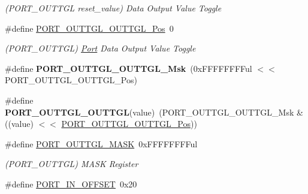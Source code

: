 \begin{DoxyCompactItemize}
\begin{DoxyCompactList}\small\item\em (P\+O\+R\+T\+\_\+\+O\+U\+T\+T\+G\+L reset\+\_\+value) Data Output Value Toggle \end{DoxyCompactList}\item 
\hypertarget{group___s_a_m_l21___p_o_r_t_ga9cccd9f68244563b806d73204ee44c3e}{}\#define \hyperlink{group___s_a_m_l21___p_o_r_t_ga9cccd9f68244563b806d73204ee44c3e}{P\+O\+R\+T\+\_\+\+O\+U\+T\+T\+G\+L\+\_\+\+O\+U\+T\+T\+G\+L\+\_\+\+Pos}~0\label{group___s_a_m_l21___p_o_r_t_ga9cccd9f68244563b806d73204ee44c3e}

\begin{DoxyCompactList}\small\item\em (P\+O\+R\+T\+\_\+\+O\+U\+T\+T\+G\+L) \hyperlink{struct_port}{Port} Data Output Value Toggle \end{DoxyCompactList}\item 
\hypertarget{group___s_a_m_l21___p_o_r_t_gad9024ad4caab786a0f4074a8e28f9638}{}\#define {\bfseries P\+O\+R\+T\+\_\+\+O\+U\+T\+T\+G\+L\+\_\+\+O\+U\+T\+T\+G\+L\+\_\+\+Msk}~(0x\+F\+F\+F\+F\+F\+F\+F\+Ful $<$$<$ P\+O\+R\+T\+\_\+\+O\+U\+T\+T\+G\+L\+\_\+\+O\+U\+T\+T\+G\+L\+\_\+\+Pos)\label{group___s_a_m_l21___p_o_r_t_gad9024ad4caab786a0f4074a8e28f9638}

\item 
\hypertarget{group___s_a_m_l21___p_o_r_t_ga41c33bcdaaea793dc1ee8f7b34ee05dd}{}\#define {\bfseries P\+O\+R\+T\+\_\+\+O\+U\+T\+T\+G\+L\+\_\+\+O\+U\+T\+T\+G\+L}(value)~(P\+O\+R\+T\+\_\+\+O\+U\+T\+T\+G\+L\+\_\+\+O\+U\+T\+T\+G\+L\+\_\+\+Msk \& ((value) $<$$<$ \hyperlink{group___s_a_m_l21___p_o_r_t_ga9cccd9f68244563b806d73204ee44c3e}{P\+O\+R\+T\+\_\+\+O\+U\+T\+T\+G\+L\+\_\+\+O\+U\+T\+T\+G\+L\+\_\+\+Pos}))\label{group___s_a_m_l21___p_o_r_t_ga41c33bcdaaea793dc1ee8f7b34ee05dd}

\item 
\hypertarget{group___s_a_m_l21___p_o_r_t_gabaf3cbe8835ddcd94e55d99946aa9c4c}{}\#define \hyperlink{group___s_a_m_l21___p_o_r_t_gabaf3cbe8835ddcd94e55d99946aa9c4c}{P\+O\+R\+T\+\_\+\+O\+U\+T\+T\+G\+L\+\_\+\+M\+A\+S\+K}~0x\+F\+F\+F\+F\+F\+F\+F\+Ful\label{group___s_a_m_l21___p_o_r_t_gabaf3cbe8835ddcd94e55d99946aa9c4c}

\begin{DoxyCompactList}\small\item\em (P\+O\+R\+T\+\_\+\+O\+U\+T\+T\+G\+L) M\+A\+S\+K Register \end{DoxyCompactList}\item 
\hypertarget{group___s_a_m_l21___p_o_r_t_ga7ce997c987c624b541986263e20a5c43}{}\#define \hyperlink{group___s_a_m_l21___p_o_r_t_ga7ce997c987c624b541986263e20a5c43}{P\+O\+R\+T\+\_\+\+I\+N\+\_\+\+O\+F\+F\+S\+E\+T}~0x20\label{group___s_a_m_l21___p_o_r_t_ga7ce997c987c624b541986263e20a5c43}


\end{DoxyCompactItemize}
